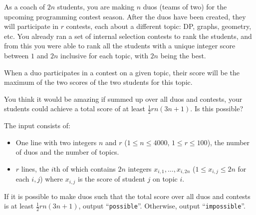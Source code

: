 

\newcommand{\maxn}{4000}
\newcommand{\maxr}{100}
\newcommand{\targetscore}{\frac 12 rn(3n+1)}

As a coach of $2n$ students, you are making $n$ duos (teams of two) for the
upcoming programming contest season.
After the duos have been created, they will participate in $r$ contests,
each about a different topic: DP, graphs, geometry, etc.
You already ran a set of
internal selection contests to rank the students, and from this you were able to rank
all the students with a unique integer score between $1$ and $2n$
inclusive for each topic, with $2n$ being the best.

When a duo participates in a contest on a given topic, their score will be the
maximum of the two scores of the two students for this topic.

You think it would be amazing if summed up over all duos and contests, your
students could achieve a total score of at least $\targetscore$. Is this
possible?

\begin{Input}
    The input consists of:
    \begin{itemize}
        \item
            One line with two integers \(n\) and \(r\) (\(1 \leq n \leq \maxn\), \(1 \leq r \leq \maxr\)), the number of duos and the number of topics.

        \item
            \(r\) lines, the \(i\)th of which contains \(2n\) integers \(x_{i,1}, \ldots, x_{i,2n}\) (\(1 \leq x_{i,j} \leq 2n\) for each \(i, j\))
            where \(x_{i,j}\) is the score of student \(j\) on topic \(i\).
    \end{itemize}
\end{Input}

\begin{Output}
    If it is possible to make duos such that the total score over all duos and contests is at least $\targetscore$,
    output ``\texttt{possible}''.
    Otherwise, output ``\texttt{impossible}''.
\end{Output}
